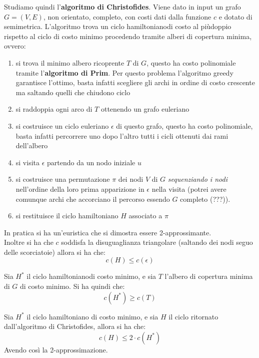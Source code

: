 \documentclass[a4paper,12pt, oneside]{book}
\begin{document}
Studiamo quindi l'\textbf{algoritmo di Christofides}. Viene dato in input un
grafo $G=(V,E)$, non orientato, completo, con costi dati dalla funzione $c$ e
dotato di semimetrica. 
L'algoritmo trova un ciclo hamiltonianodi costo al piùdoppio rispetto al ciclo
di costo minimo procedendo tramite alberi di copertura minima, ovvero:
\begin{enumerate}
  \item si trova il minimo albero ricoprente $T$ di $G$, questo ha costo
  polinomiale tramite l'\textbf{algoritmo di Prim}. Per questo problema
  l’algoritmo greedy garantisce l’ottimo, basta infatti scegliere gli archi in
  ordine di costo crescente ma saltando quelli che chiudono ciclo
  \item si raddoppia ogni arco di $T$ ottenendo un grafo euleriano
  \item si costruisce un ciclo euleriano $\epsilon$ di questo grafo, questo ha
  costo polinomiale, basta infatti percorrere uno dopo l’altro tutti i cicli
  ottenuti dai rami dell’albero 
  \item si visita $\epsilon$ partendo da un nodo iniziale $u$
  \item si costruisce una permutazione $\pi$ dei nodi $V$ di $G$
  \textit{sequenziando i nodi} nell’ordine della loro prima apparizione in
  $\epsilon$ nella visita (potrei avere comunque archi che accorciano il
  percorso essendo $G$ completo (???)). 
  \item si restituisce il ciclo hamiltoniano $H$ associato a $\pi$
\end{enumerate}
In pratica si ha un'euristica che si dimostra essere 2-approssimante.\\
Inoltre si ha che $c$ soddisfa la disuguaglianza triangolare (saltando dei nodi
seguo delle scorciatoie) allora si ha che:
\[c(H)\leq c(\epsilon)\]
\begin{teorema}
  Sia $H^*$ il ciclo hamiltonianodi costo minimo, e sia $T$ l'albero di
  copertura minima di $G$ di costo minimo. Si ha quindi che:
  \[c(H^*)\geq c(T)\]
\end{teorema}
\begin{teorema}
  Sia $H^*$ il ciclo hamiltoniano di costo minimo, e sia $H$ il ciclo ritornato
  dall’algoritmo di Christofides, allora si ha che:
  \[c(H)\leq 2\cdot c(H^*)\]
  Avendo così la 2-approssimazione.
\end{teorema}
\end{document}
